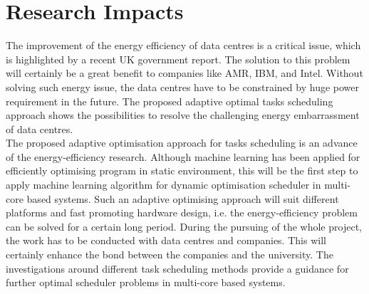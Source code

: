 \documentclass[11pt]{article}
\begin{document}
\section{Research Impacts}\label{sec:conclusion}
The improvement of the energy efficiency of data centres is a critical issue, which is highlighted by a recent UK government report\cite{ukgov}. The solution to this problem will certainly be a great benefit to companies like AMR\cite{ARM}, IBM\cite{IBM}, and Intel\cite{Intel}. Without solving such energy issue, the data centres have to be constrained by huge power requirement in the future. The proposed adaptive optimal tasks scheduling approach shows the possibilities to resolve the challenging energy embarrassment of data centres.
\\
\linebreak
The proposed adaptive optimisation approach for tasks scheduling is an advance of the energy-efficiency research. Although machine learning has been applied for efficiently optimising program in static environment\cite{wangf}, this will be the first step to apply machine learning algorithm for dynamic optimisation scheduler in multi-core based systems. Such an adaptive optimising approach will suit different platforms and fast promoting hardware design, i.e. the energy-efficiency problem can be solved for a certain long period. During the pursuing of the whole project, the work has to be conducted with data centres and companies. This will certainly enhance the bond between the companies and the university. The investigations around different task scheduling methods provide a guidance for further optimal scheduler problems in multi-core based systems.

\pagebreak

\nocite{*}

\begin{spacing}{1}
  
  
\end{spacing}
\end{document}
